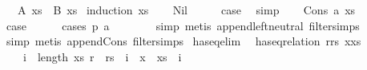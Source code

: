 \begin{isabellebody}
\ \ {\isacharparenleft}{\kern0pt}\ {\isachardoublequoteopen}{\isacharquery}{\kern0pt}A\ xs\ {\isasymLongrightarrow}\ {\isacharquery}{\kern0pt}B\ xs{\isachardoublequoteclose}{\isacharparenright}{\kern0pt}\isanewline
%
\isadelimproof
%
\endisadelimproof
%
\isatagproof
{}\isamarkupfalse%
\ {\isacharparenleft}{\kern0pt}induction\ xs{\isacharparenright}{\kern0pt}\isanewline
\ \ \isamarkupfalse%
\ Nil\isanewline
\ \ \isamarkupfalse%
\ \isamarkupfalse%
\ {\isacharquery}{\kern0pt}case\ \isamarkupfalse%
\ simp\isanewline
{}\isamarkupfalse%
\isanewline
\ \ \isamarkupfalse%
\ {\isacharparenleft}{\kern0pt}Cons\ a\ xs{\isacharparenright}{\kern0pt}\isanewline
\ \ \isamarkupfalse%
\ \isamarkupfalse%
\ {\isacharquery}{\kern0pt}case\isanewline
\ \ \ \ \isamarkupfalse%
\ {\isacharparenleft}{\kern0pt}cases\ {\isachardoublequoteopen}p\ a{\isachardoublequoteclose}{\isacharparenright}{\kern0pt}\ \isanewline
\ \ \ \ \ \isamarkupfalse%
\ {\isacharparenleft}{\kern0pt}simp{\isacharcomma}{\kern0pt}\ metis\ append{\isachardot}{\kern0pt}left{\isacharunderscore}{\kern0pt}neutral\ filter{\isachardot}{\kern0pt}simps{\isacharparenleft}{\kern0pt}{}{\isacharparenright}{\kern0pt}{\isacharparenright}{\kern0pt}\isanewline
\ \ \ \ \isamarkupfalse%
\ {\isacharparenleft}{\kern0pt}simp{\isacharcomma}{\kern0pt}\ metis\ append{\isacharunderscore}{\kern0pt}Cons\ filter{\isachardot}{\kern0pt}simps{\isacharparenleft}{\kern0pt}{}{\isacharparenright}{\kern0pt}{\isacharparenright}{\kern0pt}\isanewline
{}\isamarkupfalse%
%
\endisatagproof
{\isafoldproof}%
%
\isadelimproof
\isanewline
%
\endisadelimproof
\isanewline
{}\isamarkupfalse%
\ has{\isacharunderscore}{\kern0pt}eq{\isacharunderscore}{\kern0pt}elim{\isacharcolon}{\kern0pt}\isanewline
\ \ {\isachardoublequoteopen}has{\isacharunderscore}{\kern0pt}eq{\isacharunderscore}{\kern0pt}relation\ {\isacharparenleft}{\kern0pt}r{\isacharhash}{\kern0pt}rs{\isacharparenright}{\kern0pt}\ {\isacharparenleft}{\kern0pt}x{\isacharhash}{\kern0pt}xs{\isacharparenright}{\kern0pt}\ {\isacharequal}{\kern0pt}\ {\isacharparenleft}{\kern0pt}\isanewline
\ \ \ \ {\isacharparenleft}{\kern0pt}{\isasymforall}i\ {\isacharless}{\kern0pt}\ length\ xs{\isachardot}{\kern0pt}\ {\isacharparenleft}{\kern0pt}r\ {\isacharequal}{\kern0pt}\ rs\ {\isacharbang}{\kern0pt}\ i{\isacharparenright}{\kern0pt}\ {\isacharequal}{\kern0pt}\ {\isacharparenleft}{\kern0pt}x\ {\isacharequal}{\kern0pt}\ xs\ {\isacharbang}{\kern0pt}\ i{\isacharparenright}{\kern0pt}{\isacharparenright}{\kern0pt}\ {\isasymand}\isanewline

\end{isabellebody}
